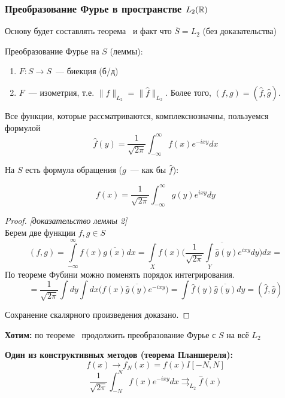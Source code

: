 \subsubsection{Преобразование Фурье в пространстве $L_2(\mathbb{R})$}

Основу будет составлять теорема~ и факт что
$\overline{S}=L_2$ (без доказательства)

Преобразование Фурье на $S$ (леммы):
\begin{enumerate}
    \item\label{fourier_l2_lemma_1} $F:S \to S$~--- биекция (б/д)
    \item\label{fourier_l2_lemma_2} $F$~--- изометрия, т.е. $\|f\|_{L_2} = \| \widehat{f}\|_{L_2}$. Более того, $(f,g)=(\widehat{f}, \widehat{g})$.
\end{enumerate}
\begin{note}
        Все функции, которые рассматриваются, комплекснозначны, пользуемся формулой
        \[ \widehat{f}(y)=\frac{1}{\sqrt{2 \pi}} \int_{-\infty}^{\infty} f(x) e^{-ixy} dx \]

        На $S$ есть формула обращения ($g$~--- как бы $\widehat{f}$):

        \[ f(x)=\frac{1}{\sqrt{2 \pi}} \int_{-\infty}^{\infty} g(y)e^{ixy} dy \]
\end{note}
\begin{proof}\textit{[доказательство леммы 2]}\\
    Берем две функции $f, g \in S$
    \begin{equation*}
        (f,g) = \int\limits_{-\infty}^{\infty}f(x)\overline{g(x)}dx = \int\limits_{X}^{}f(x) \overline{\Big(\frac{1}{\sqrt{2 \pi}} \int\limits_Y \widehat{g}(y) e^{i x y} dy\Big)}dx =
    \end{equation*}
    По теореме Фубини можно поменять порядок интегрирования.
    \begin{equation*}
        = \frac{1}{\sqrt{2 \pi}} \int dy \int dx \Big(f(x) \overline{\widehat{g}(y)}e^{-ixy}\Big)=\int \widehat{f}(y) \overline{\widehat{g}(y)} dy = (\widehat{f}, \widehat{g})
    \end{equation*}
    
    Сохранение скалярного произведения доказано.
\end{proof}

\begin{unnecessary}
    \textbf{Хотим:} по теореме~ продолжить преобразование Фурье с $S$ на всё $L_2$
    
    \textbf{Один из конструктивных методов (теорема Планшереля):}
    \[ f(x) \to f_N(x) = f(x) I[-N, N] \]
    \[\frac{1}{\sqrt{2 \pi}} \int_{-N}^N f(x) e^{-ixy} dx \rightrightarrows_{L_2} \widehat{f}(x)\]
\end{unnecessary}


